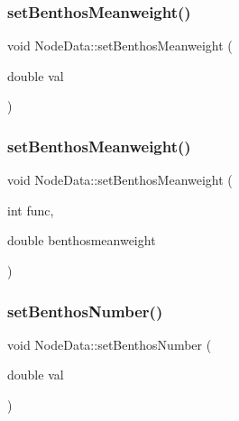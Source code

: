 \subsubsection{\texorpdfstring{setBenthosMeanweight()}{setBenthosMeanweight()}\hspace{0.1cm}{\footnotesize\ttfamily [1/2]}}
{\footnotesize\ttfamily void Node\+Data\+::set\+Benthos\+Meanweight (\begin{DoxyParamCaption}\item[{double}]{val }\end{DoxyParamCaption})\hspace{0.3cm}{\ttfamily [inline]}}

\mbox{\label{class_node_data_a44d5979737b1f4ff1c6c8b64e2f9ed77}} 
\subsubsection{\texorpdfstring{setBenthosMeanweight()}{setBenthosMeanweight()}\hspace{0.1cm}{\footnotesize\ttfamily [2/2]}}
{\footnotesize\ttfamily void Node\+Data\+::set\+Benthos\+Meanweight (\begin{DoxyParamCaption}\item[{int}]{func,  }\item[{double}]{benthosmeanweight }\end{DoxyParamCaption})}

\mbox{\label{class_node_data_a7ffda826e25b84bd34ff2182484f10dc}} 
\subsubsection{\texorpdfstring{setBenthosNumber()}{setBenthosNumber()}\hspace{0.1cm}{\footnotesize\ttfamily [1/2]}}
{\footnotesize\ttfamily void Node\+Data\+::set\+Benthos\+Number (\begin{DoxyParamCaption}\item[{double}]{val }\end{DoxyParamCaption})\hspace{0.3cm}{\ttfamily [inline]}}

